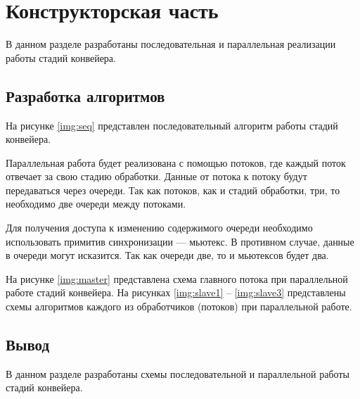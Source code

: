 
\chapter{Конструкторская часть}
В данном разделе разработаны последовательная и параллельная реализации работы стадий конвейера.
\section{Разработка алгоритмов}

На рисунке \ref{img:seq} представлен последовательный алгоритм работы стадий конвейера.

\clearpage

Параллельная работа будет реализована с помощью потоков, где каждый поток отвечает за свою стадию обработки.
Данные от потока к потоку будут передаваться через очереди.
Так как потоков, как и стадий обработки, три, то необходимо две очереди между потоками.

Для получения доступа к изменению содержимого очереди необходимо использовать примитив синхронизации --- мьютекс.
В противном случае, данные в очереди могут исказится.
Так как очереди две, то и мьютексов будет два.


На рисунке \ref{img:master} представлена схема главного потока при параллельной работе стадий конвейера.
\clearpage
На рисунках \ref{img:slave1} -- \ref{img:slave3} представлены схемы алгоритмов каждого из обработчиков (потоков) при параллельной работе.
\clearpage
{}
\clearpage
{}
\section*{Вывод}
В данном разделе разработаны схемы последовательной и параллельной работы стадий конвейера.